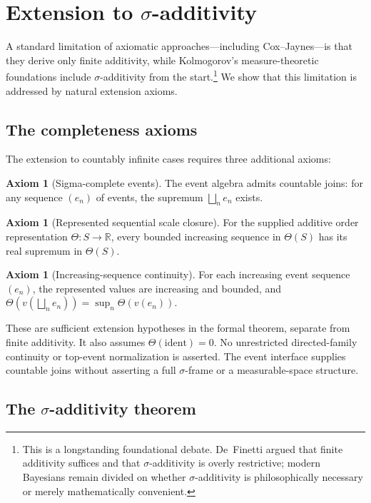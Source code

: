 \documentclass[11pt]{article}
\theoremstyle{definition}
\newtheorem{axiom}[theorem]{Axiom}
\theoremstyle{remark}
\begin{document}
\section{Extension to $\sigma$-additivity}
\label{sec:sigma-extension}

A standard limitation of axiomatic approaches---including Cox--Jaynes---is that they derive
only finite additivity, while Kolmogorov's measure-theoretic foundations include $\sigma$-additivity
from the start.\footnote{This is a longstanding foundational debate.  De~Finetti \cite{deFinetti1974}
argued that finite additivity suffices and that $\sigma$-additivity is overly restrictive;
modern Bayesians remain divided on whether $\sigma$-additivity is philosophically necessary
or merely mathematically convenient.}
We show that this limitation is addressed by natural extension axioms.

\subsection{The completeness axioms}

The extension to countably infinite cases requires three additional axioms:

\begin{axiom}[Sigma-complete events]
The event algebra admits countable joins: for any sequence $(e_n)$ of events,
the supremum $\bigsqcup_n e_n$ exists.
\end{axiom}

\begin{axiom}[Represented sequential scale closure]
For the supplied additive order representation $\Theta:S\to\mathbb{R}$,
every bounded increasing sequence in $\Theta(S)$ has its real supremum in $\Theta(S)$.
\end{axiom}

\begin{axiom}[Increasing-sequence continuity]
For each increasing event sequence $(e_n)$, the represented values are increasing
and bounded, and
$\Theta(v(\bigsqcup_n e_n))=\sup_n\Theta(v(e_n))$.
\end{axiom}

These are sufficient extension hypotheses in the formal theorem, separate from
finite additivity. It also assumes $\Theta(\mathrm{ident})=0$. No unrestricted
directed-family continuity or top-event normalization is asserted. The event
interface supplies countable joins without asserting a full $\sigma$-frame
or a measurable-space structure.

\subsection{The $\sigma$-additivity theorem}
\end{document}
